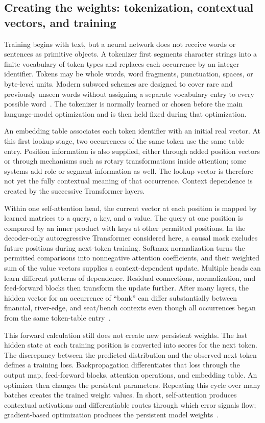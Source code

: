 \documentclass[
  aps,
  reprint,
  superscriptaddress,
  floatfix,
  nofootinbib,
  longbibliography
]{revtex4-2}
\begin{document}
\subsection{Creating the weights: tokenization, contextual vectors, and training}
\label{sec:prose-training}

Training begins with text, but a neural network does not receive words or
sentences as primitive objects.  A tokenizer first segments character strings
into a finite vocabulary of token types and replaces each occurrence by an
integer identifier.  Tokens may be whole words, word fragments, punctuation,
spaces, or byte-level units.  Modern subword schemes are designed to cover
rare and previously unseen words without assigning a separate vocabulary
entry to every possible word~\cite{sennrich2016subword,Brown2020May}.  The
tokenizer is normally learned or chosen before the main language-model
optimization and is then held fixed during that optimization.

An embedding table associates each token identifier with an initial real
vector.  At this first lookup stage, two occurrences of the same token use the
same table entry.  Position information is also supplied, either through
added position vectors or through mechanisms such as rotary transformations
inside attention; some systems add role or segment information as well.  The
lookup vector is therefore not yet the fully contextual meaning of that
occurrence.  Context dependence is created by the successive Transformer
layers.

Within one self-attention head, the current vector at each position is mapped
by learned matrices to a query, a key, and a value.  The query at one position
is compared by an inner product with keys at other permitted positions.  In
the decoder-only autoregressive Transformer considered here, a causal mask
excludes future positions during next-token training.  Softmax normalization
turns the permitted comparisons into nonnegative attention coefficients, and
their weighted sum of the value vectors supplies a context-dependent update.
Multiple heads can learn different patterns of dependence.  Residual
connections, normalization, and feed-forward blocks then transform the update
further.  After many layers, the hidden vector for an occurrence of ``bank''
can differ substantially between financial, river-edge, and seat/bench
contexts even though all occurrences began from the same token-table
entry~\cite{Vaswani-2017-Attention}.

This forward calculation still does not create new persistent weights.  The
last hidden state at each training position is converted into scores for the
next token.  The discrepancy between the predicted distribution and the
observed next token defines a training loss.  Backpropagation differentiates
that loss through the output map, feed-forward blocks, attention operations,
and embedding table.  An optimizer then changes the persistent parameters.
Repeating this cycle over many batches creates the trained weight values.  In
short, self-attention produces contextual activations and differentiable
routes through which error signals flow; gradient-based optimization produces
the persistent model weights~\cite{Goodfellow-et-al-2016-Book}.
\end{document}
